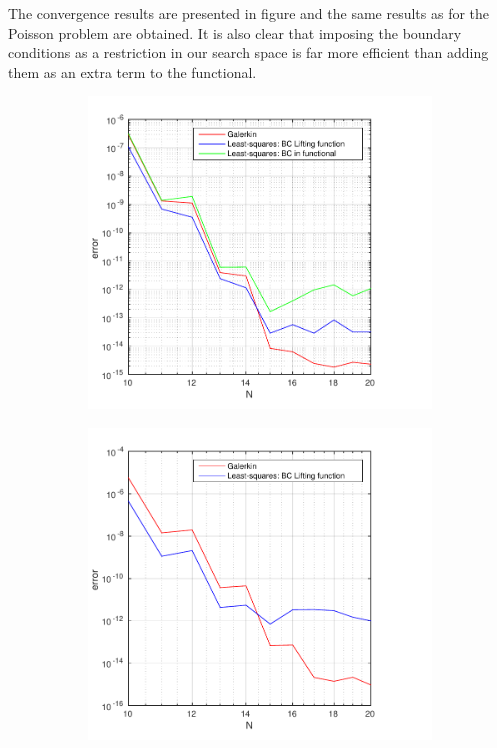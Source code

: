 The convergence results are presented in figure and the same results as for the Poisson problem are obtained. It is also clear that imposing the boundary conditions as a restriction in our search space is far more efficient than adding them as an extra term to the functional. 

%
\begin{figure}[h!]
  \centering
  \begin{subfigure}[b]{0.48\textwidth}
		\includegraphics[width=\textwidth]{Figures/Spec_difftrans_Convergence.pdf}
  \end{subfigure}%
  \quad
  \begin{subfigure}[b]{0.48\textwidth}
		\includegraphics[width=\textwidth]{Figures/Spec_difftrans_Convergence_Neu.pdf}

\end{subfigure}
\end{figure}
